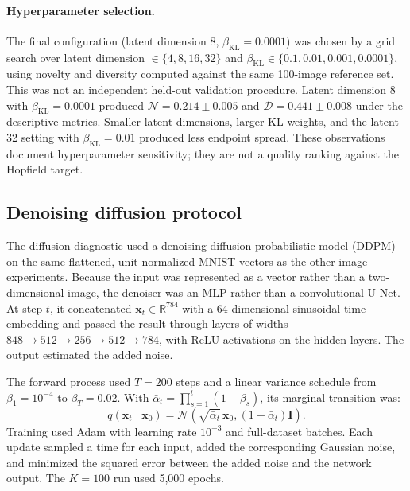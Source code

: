 \paragraph{Hyperparameter selection.}
The final configuration (latent dimension 8,
$\beta_{\mathrm{KL}}=0.0001$) was chosen by a grid search over latent
dimension $\in\{4,8,16,32\}$ and
$\beta_{\mathrm{KL}}\in\{0.1,0.01,0.001,0.0001\}$, using novelty and diversity
computed against the same 100-image reference set. This was not an independent
held-out validation procedure.
Latent dimension 8 with $\beta_{\mathrm{KL}}=0.0001$ produced
$\mathcal{N}=0.214\pm0.005$ and $\bar{\mathcal{D}}=0.441\pm0.008$ under the
descriptive metrics. Smaller latent dimensions, larger KL weights,
and the latent-32 setting with $\beta_{\mathrm{KL}}=0.01$ produced less endpoint
spread. These observations document hyperparameter sensitivity; they are not a
quality ranking against the Hopfield target.

\subsection{Denoising diffusion protocol}\label{app:ddpm}

The diffusion diagnostic used a denoising diffusion probabilistic model
(DDPM)~\cite{hoDenoisingDiffusionProbabilistic2020} on the same flattened,
unit-normalized MNIST vectors as the other image experiments. Because the input
was represented as a vector rather than a two-dimensional image, the denoiser
was an MLP rather than a convolutional U-Net. At step $t$, it concatenated
$\mathbf x_t\in\mathbb R^{784}$ with a 64-dimensional sinusoidal time
embedding and passed the result through layers of widths
$848\to512\to256\to512\to784$, with ReLU activations on the hidden layers.
The output estimated the added noise.

The forward process used $T=200$ steps and a linear variance schedule from
$\beta_1=10^{-4}$ to $\beta_T=0.02$. With
$\bar\alpha_t=\prod_{s=1}^t(1-\beta_s)$, its marginal transition was:
\begin{equation}
q(\mathbf x_t\mid\mathbf x_0)
=\mathcal N\!\left(\sqrt{\bar\alpha_t}\,\mathbf x_0,
(1-\bar\alpha_t)\mathbf I\right).
\end{equation}
Training used Adam with learning rate $10^{-3}$ and full-dataset batches. Each
update sampled a time for each input, added the corresponding Gaussian noise,
and minimized the squared error between the added noise and the network output.
The $K=100$ run used 5,000 epochs.

